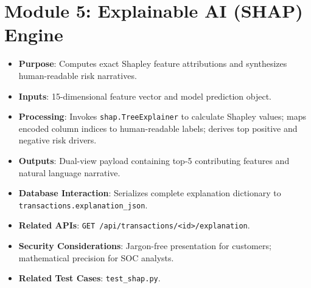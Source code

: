 \section{Module 5: Explainable AI (SHAP) Engine}
\begin{itemize}
    \item \textbf{Purpose}: Computes exact Shapley feature attributions and synthesizes human-readable risk narratives.
    \item \textbf{Inputs}: 15-dimensional feature vector and model prediction object.
    \item \textbf{Processing}: Invokes \texttt{shap.TreeExplainer} to calculate Shapley values; maps encoded column indices to human-readable labels; derives top positive and negative risk drivers.
    \item \textbf{Outputs}: Dual-view payload containing top-5 contributing features and natural language narrative.
    \item \textbf{Database Interaction}: Serializes complete explanation dictionary to \texttt{transactions.explanation\_json}.
    \item \textbf{Related APIs}: \texttt{GET /api/transactions/<id>/explanation}.
    \item \textbf{Security Considerations}: Jargon-free presentation for customers; mathematical precision for SOC analysts.
    \item \textbf{Related Test Cases}: \texttt{test\_shap.py}.
\end{itemize}

